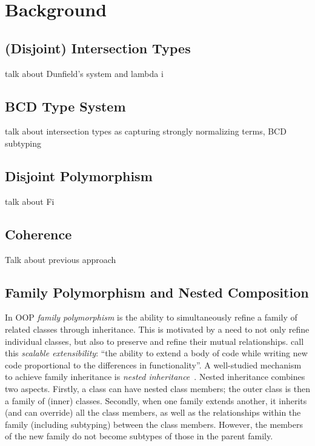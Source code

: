 
\chapter{Background}
\label{chap:background}



\section{(Disjoint) Intersection Types}
\label{bg:sec:intersection}

talk about Dunfield's system and lambda i

\section{BCD Type System}

talk about intersection types as capturing  strongly normalizing terms, BCD subtyping

\section{Disjoint Polymorphism}

talk about Fi

\section{Coherence}

Talk about previous approach


\section{Family Polymorphism and Nested Composition}


In OOP \emph{family polymorphism} is the ability to
simultaneously refine a family of related classes through inheritance. This is
motivated by a need to not only refine individual classes, but also to preserve
and refine their mutual relationships. \citet{Nystrom_2004} call this
\emph{scalable extensibility}: ``the ability to extend a body of code while
writing new code proportional to the differences in functionality''.
%
A well-studied mechanism to achieve family inheritance is \emph{nested
inheritance}~\citep{Nystrom_2004}. Nested inheritance combines two aspects.
Firstly, a class can have nested class members; the outer class is then a
family of (inner) classes. Secondly, when one family extends another, it
inherits (and can override) all the class members, as well as the relationships
within the family (including subtyping) between the class members. However,
the members of the new family do not become subtypes of those in the parent family.

